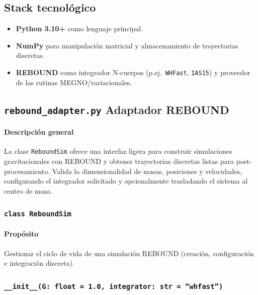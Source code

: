 \subsection{Stack tecnológico}
\begin{itemize}
    \item \textbf{Python 3.10+} como lenguaje principal.
    \item \textbf{NumPy} para manipulación matricial y almacenamiento de trayectorias discretas.
    \item \textbf{REBOUND} como integrador N-cuerpos (p.ej.\ \texttt{WHFast}, \texttt{IAS15}) y proveedor de las rutinas MEGNO/variacionales.
\end{itemize}


\subsection{\texttt{rebound\_adapter.py} \- Adaptador REBOUND}
\paragraph{Descripción general}
La clase \texttt{ReboundSim} ofrece una interfaz ligera para construir simulaciones gravitacionales con REBOUND y obtener trayectorias discretas listas para post-procesamiento. Valida la dimensionalidad de masas, posiciones y velocidades, configurando el integrador solicitado y opcionalmente trasladando el sistema al centro de masa.\\

\subsubsection{\texttt{class ReboundSim}}
\paragraph{Propósito} Gestionar el ciclo de vida de una simulación REBOUND (creación, configuración e integración discreta).

\subsubsection*{\texttt{\_\_init\_\_(G:\ float = 1.0, integrator: str = ``whfast'')}}

